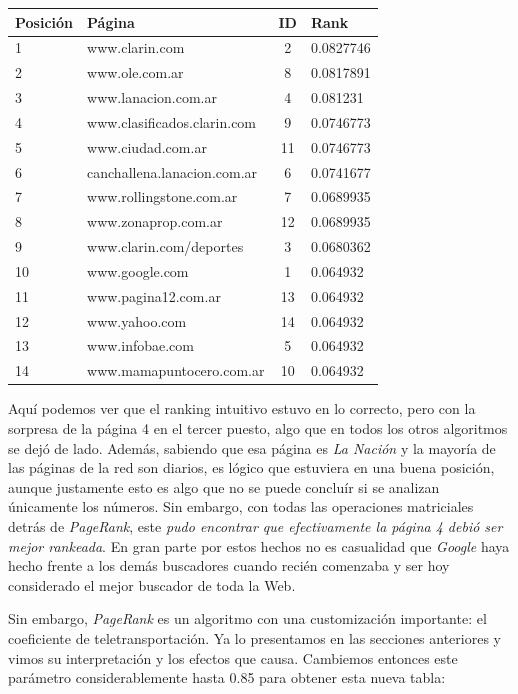 \begin{center}
    \begin{tabular}{| l | l | c | l|}
    \hline
    Posición & Página & ID & Rank  \\ \hline
    
	1 & www.clarin.com & 2 & 0.0827746 \\ \hline
	2 & www.ole.com.ar & 8 & 0.0817891 \\ \hline
	3 & www.lanacion.com.ar & 4 & 0.081231 \\ \hline
	4 & www.clasificados.clarin.com & 9 & 0.0746773 \\ \hline
	5 & www.ciudad.com.ar & 11 & 0.0746773 \\ \hline
	6 & canchallena.lanacion.com.ar & 6 & 0.0741677 \\ \hline
	7 & www.rollingstone.com.ar & 7 & 0.0689935 \\ \hline
	8 & www.zonaprop.com.ar & 12 & 0.0689935 \\ \hline
	9 & www.clarin.com/deportes & 3 & 0.0680362 \\ \hline
	10 & www.google.com & 1 & 0.064932  \\ \hline
	11 & www.pagina12.com.ar & 13 & 0.064932	\\ \hline		
	12 & www.yahoo.com & 14 & 0.064932 \\ \hline
	13 & www.infobae.com & 5 & 0.064932 \\ \hline
	14 & www.mamapuntocero.com.ar & 10 & 0.064932 \\ \hline   
    \end{tabular}
\end{center}


Aquí podemos ver que el ranking intuitivo estuvo en lo correcto, pero con la sorpresa de la página 4 en el tercer puesto, algo que en todos los otros algoritmos se dejó de lado. Además, sabiendo que esa página es \textit{La Nación} y la mayoría de las páginas de la red son diarios, es lógico que estuviera en una buena posición, aunque justamente esto es algo que no se puede concluír si se analizan únicamente los números. Sin embargo, con todas las operaciones matriciales detrás de \textit{PageRank}, este \textit{pudo encontrar que efectivamente la página 4 debió ser mejor rankeada}. En gran parte por estos hechos no es casualidad que \textit{Google} haya hecho frente a los demás buscadores cuando recién comenzaba y ser hoy considerado el mejor buscador de toda la Web. 

Sin embargo, \textit{PageRank} es un algoritmo con una customización importante: el coeficiente de teletransportación. Ya lo presentamos en las secciones anteriores y vimos su interpretación y los efectos que causa. Cambiemos entonces este parámetro considerablemente hasta 0.85 para obtener esta nueva tabla:

